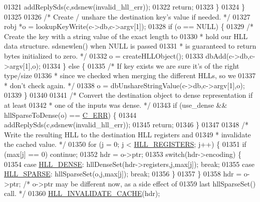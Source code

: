 \begin{DoxyCode}
{{01321             addReplySds(c,sdsnew(invalid\_hll\_err));
01322             \textcolor{keywordflow}{return};
01323         \}
01324     \}
01325 
01326     \textcolor{comment}{/* Create / unshare the destination key's value if needed. */}
01327     robj *o = lookupKeyWrite(c->db,c->argv[1]);
01328     \textcolor{keywordflow}{if} (o == NULL) \{
01329         \textcolor{comment}{/* Create the key with a string value of the exact length to}
01330 \textcolor{comment}{         * hold our HLL data structure. sdsnewlen() when NULL is passed}
01331 \textcolor{comment}{         * is guaranteed to return bytes initialized to zero. */}
01332         o = createHLLObject();
01333         dbAdd(c->db,c->argv[1],o);
01334     \} \textcolor{keywordflow}{else} \{
01335         \textcolor{comment}{/* If key exists we are sure it's of the right type/size}
01336 \textcolor{comment}{         * since we checked when merging the different HLLs, so we}
01337 \textcolor{comment}{         * don't check again. */}
01338         o = dbUnshareStringValue(c->db,c->argv[1],o);
01339     \}
01340 
01341     \textcolor{comment}{/* Convert the destination object to dense representation if at least}
01342 \textcolor{comment}{     * one of the inputs was dense. */}
01343     \textcolor{keywordflow}{if} (use\_dense && hllSparseToDense(o) == \hyperlink{server_8h_af98ac28d5f4d23d7ed5985188e6fb7d1}{C\_ERR}) \{
01344         addReplySds(c,sdsnew(invalid\_hll\_err));
01345         \textcolor{keywordflow}{return};
01346     \}
01347 
01348     \textcolor{comment}{/* Write the resulting HLL to the destination HLL registers and}
01349 \textcolor{comment}{     * invalidate the cached value. */}
01350     \textcolor{keywordflow}{for} (j = 0; j < \hyperlink{hyperloglog_8c_aa053beb90136828dcb46545c7445fc36}{HLL\_REGISTERS}; j++) \{
01351         \textcolor{keywordflow}{if} (max[j] == 0) \textcolor{keywordflow}{continue};
01352         hdr = o->ptr;
01353         \textcolor{keywordflow}{switch}(hdr->encoding) \{
01354         \textcolor{keywordflow}{case} \hyperlink{hyperloglog_8c_a5f2ead2492fc9cc4ff39f8c1752875a1}{HLL\_DENSE}: hllDenseSet(hdr->registers,j,max[j]); \textcolor{keywordflow}{break};
01355         \textcolor{keywordflow}{case} \hyperlink{hyperloglog_8c_afe326d57dd3d7c27c8fe52dc2c19cecd}{HLL\_SPARSE}: hllSparseSet(o,j,max[j]); \textcolor{keywordflow}{break};
01356         \}
01357     \}
01358     hdr = o->ptr; \textcolor{comment}{/* o->ptr may be different now, as a side effect of}
01359 \textcolor{comment}{                     last hllSparseSet() call. */}
01360     \hyperlink{hyperloglog_8c_aba6246a823dc41dc866a6af8828ae375}{HLL\_INVALIDATE\_CACHE}(hdr);
}}
\end{DoxyCode}
